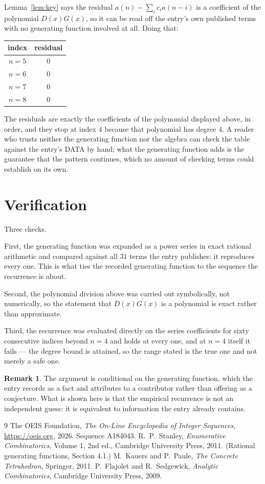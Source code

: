 \documentclass[11pt,a4paper]{article}
\theoremstyle{plain}
\theoremstyle{definition}
\newtheorem{remark}[theorem]{Remark}
\begin{document}
Lemma~\ref{lem:key} says the residual $a(n)-\sum_ic_ia(n-i)$ is a coefficient of the
polynomial $D(x)G(x)$, so it can be read off the entry's own published terms with no
generating function involved at all. Doing that:
\begin{center}
\begin{tabular}{cc}
index & residual \\ \hline
$n=5$ & $0$ \\
$n=6$ & $0$ \\
$n=7$ & $0$ \\
$n=8$ & $0$
\end{tabular}
\end{center}
The residuals are exactly the coefficients of the polynomial displayed above, in order, and
they stop at index $4$ because that polynomial has degree $4$. A reader who trusts
neither the generating function nor the algebra can check the table against the entry's DATA
by hand; what the generating function adds is the guarantee that the pattern continues, which
no amount of checking terms could establish on its own.

\section{Verification}

Three checks.

First, the generating function was expanded as a power series in exact rational arithmetic and
compared against all $31$ terms the entry publishes: it reproduces every one. This is
what ties the recorded generating function to the sequence the recurrence is about.

Second, the polynomial division above was carried out symbolically, not numerically, so the
statement that $D(x)G(x)$ is a polynomial is exact rather than approximate.

Third, the recurrence was evaluated directly on the series coefficients for sixty consecutive
indices beyond $n=4$ and holds at every one, and at $n=4$ itself it fails --- the
degree bound is attained, so the range stated is the true one and not merely a safe one.

\begin{remark}
The argument is conditional on the generating function, which the entry records as a fact and
attributes to a contributor rather than offering as a conjecture. What is shown here is that
the empirical recurrence is not an independent guess: it is equivalent to information the
entry already contains.
\end{remark}

\begin{thebibliography}{9}
 The OEIS Foundation, \emph{The On-Line Encyclopedia of Integer
Sequences}, \url{https://oeis.org}, 2026. Sequence A184043.
 R.~P.~Stanley, \emph{Enumerative Combinatorics}, Volume 1, 2nd ed.,
Cambridge University Press, 2011. (Rational generating functions, Section 4.1.)
 M.~Kauers and P.~Paule, \emph{The Concrete Tetrahedron}, Springer, 2011.
 P.~Flajolet and R.~Sedgewick, \emph{Analytic Combinatorics}, Cambridge
University Press, 2009.
\end{thebibliography}
\end{document}

